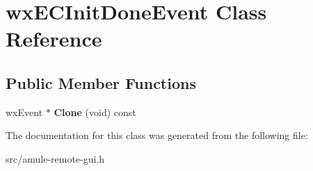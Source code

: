 \section{wxECInitDoneEvent Class Reference}
\label{classwxECInitDoneEvent}
\subsection*{Public Member Functions}
\begin{DoxyCompactItemize}
\item 
wxEvent $\ast$ {\bfseries Clone} (void) const \label{classwxECInitDoneEvent_a22e1ee76dcaf912e92c8826eacad70a4}

\end{DoxyCompactItemize}


The documentation for this class was generated from the following file:\begin{DoxyCompactItemize}
\item 
src/amule-\/remote-\/gui.h\end{DoxyCompactItemize}
